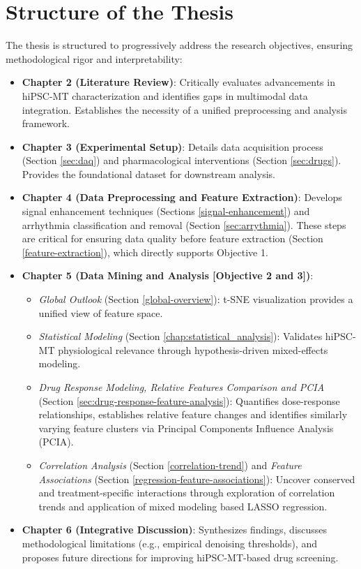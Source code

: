 \documentclass{report}
\begin{document}
\section{Structure of the Thesis}
The thesis is structured to progressively address the research objectives, ensuring methodological rigor and interpretability:

\begin{itemize}
    \item \textbf{Chapter 2 (Literature Review)}: Critically evaluates advancements in hiPSC-MT characterization and identifies gaps in multimodal data integration. Establishes the necessity of a unified preprocessing and analysis framework.

    \item \textbf{Chapter 3 (Experimental Setup)}: Details data acquisition process (Section \ref{sec:daq}) and pharmacological interventions (Section \ref{sec:drugs}). Provides the foundational dataset for downstream analysis.

    \item \textbf{Chapter 4 (Data Preprocessing and Feature Extraction)}: Develops signal enhancement techniques (Sections \ref{signal-enhancement}) and arrhythmia classification and removal (Section \ref{sec:arrythmia}). These steps are critical for ensuring data quality before feature extraction (Section \ref{feature-extraction}), which directly supports Objective 1.

    \item \textbf{Chapter 5 (Data Mining and Analysis [Objective 2 and 3])}:
    \begin{itemize}
        \item \emph{Global Outlook} (Section \ref{global-overview}): t-SNE visualization provides a unified view of feature space.
        \item \emph{Statistical Modeling} (Section \ref{chap:statistical_analysis}): Validates hiPSC-MT physiological relevance through hypothesis-driven mixed-effects modeling.
        \item \emph{Drug Response Modeling, Relative Features Comparison and PCIA} (Section \ref{sec:drug-response-feature-analysis}): Quantifies dose-response relationships, establishes relative feature changes and identifies similarly varying feature clusters via Principal Components Influence Analysis (PCIA).
        \item \emph{Correlation Analysis} (Section \ref{correlation-trend}) and \emph{Feature Associations} (Section \ref{regression-feature-associations}): Uncover conserved and treatment-specific interactions through exploration of correlation trends and application of mixed modeling based LASSO regression.
    \end{itemize}

    \item \textbf{Chapter 6 (Integrative Discussion)}: Synthesizes findings, discusses methodological limitations (e.g., empirical denoising thresholds), and proposes future directions for improving hiPSC-MT-based drug screening.
\end{itemize}
\end{document}
